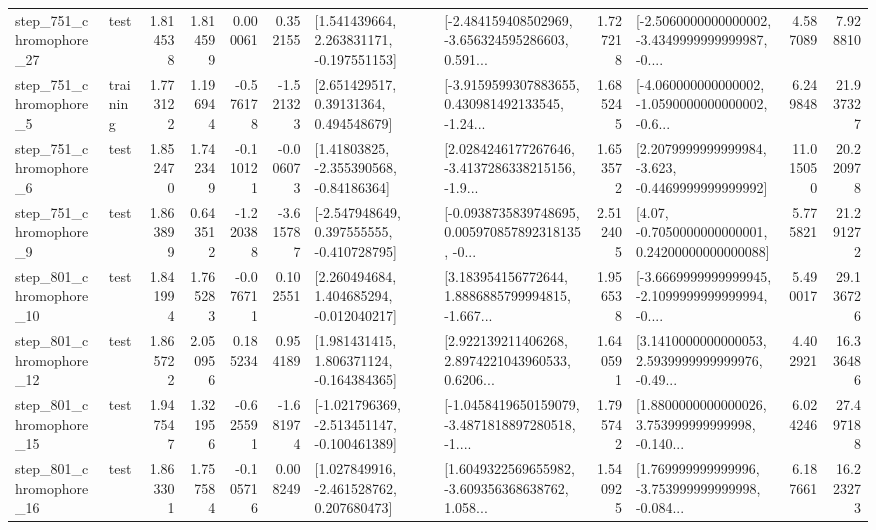 \begin{tabular}{llrrrrllrlrr}
  step\_751\_chromophore\_27 &      test &      1.814538 &    1.814599 &      0.000061 &  0.352155 &    [1.541439664, 2.263831171, -0.197551153] &  [-2.484159408502969, -3.656324595286603, 0.591... &       1.727218 &  [-2.5060000000000002, -3.4349999999999987, -0.... &            4.587089 &          7.928810 \\
   step\_751\_chromophore\_5 &  training &      1.773122 &    1.196944 &     -0.576178 & -1.521323 &      [2.651429517, 0.39131364, 0.494548679] &  [-3.9159599307883655, 0.430981492133545, -1.24... &       1.685245 &  [-4.060000000000002, -1.0590000000000002, -0.6... &            6.249848 &         21.937327 \\
   step\_751\_chromophore\_6 &      test &      1.852470 &    1.742349 &     -0.110121 & -0.006073 &     [1.41803825, -2.355390568, -0.84186364] &  [2.0284246177267646, -3.4137286338215156, -1.9... &       1.653572 &  [2.2079999999999984, -3.623, -0.4469999999999992] &           11.015050 &         20.220978 \\
   step\_751\_chromophore\_9 &      test &      1.863899 &    0.643512 &     -1.220388 & -3.615787 &   [-2.547948649, 0.397555555, -0.410728795] &  [-0.0938735839748695, 0.005970857892318135, -0... &       2.512405 &   [4.07, -0.7050000000000001, 0.24200000000000088] &            5.775821 &         21.291272 \\
  step\_801\_chromophore\_10 &      test &      1.841994 &    1.765283 &     -0.076711 &  0.102551 &    [2.260494684, 1.404685294, -0.012040217] &  [3.183954156772644, 1.8886885799994815, -1.667... &       1.956538 &  [-3.6669999999999945, -2.1099999999999994, -0.... &            5.490017 &         29.136726 \\
  step\_801\_chromophore\_12 &      test &      1.865722 &    2.050956 &      0.185234 &  0.954189 &    [1.981431415, 1.806371124, -0.164384365] &  [2.922139211406268, 2.8974221043960533, 0.6206... &       1.640591 &  [3.1410000000000053, 2.5939999999999976, -0.49... &            4.402921 &         16.336486 \\
  step\_801\_chromophore\_15 &      test &      1.947547 &    1.321956 &     -0.625591 & -1.681974 &  [-1.021796369, -2.513451147, -0.100461389] &  [-1.0458419650159079, -3.4871818897280518, -1.... &       1.795742 &  [1.8800000000000026, 3.753999999999998, -0.140... &            6.024246 &         27.497188 \\
  step\_801\_chromophore\_16 &      test &      1.863301 &    1.757584 &     -0.105716 &  0.008249 &    [1.027849916, -2.461528762, 0.207680473] &  [1.6049322569655982, -3.609356368638762, 1.058... &       1.540925 &  [1.769999999999996, -3.753999999999998, -0.084... &            6.187661 &         16.223273 \\

\end{tabular}

